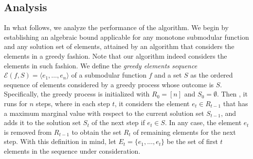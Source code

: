 \documentclass[11pt]{article}
\theoremstyle{plain}
\theoremstyle{definition}
\begin{document}
\subsection{Analysis} \label{subsec:Analysis}
In what follows, we analyze the performance of the algorithm. We
begin by establishing an algebraic bound applicable for any
monotone submodular function and any solution set of elements,
attained by an algorithm that considers the elements in a greedy
fashion. Note that our algorithm indeed considers the elements in
such fashion. We define the \emph{greedy elements sequence}
$\mathcal{E}(f,S) = \langle e_1, \ldots, e_n \rangle$ of a
submodular function $f$ and a set $S$ as the ordered sequence of
elements considered by a greedy process whose outcome is $S$.
Specifically, the greedy process is initialized with $R_0 = [n]$
and $S_0 = \emptyset$. Then , it runs for $n$ steps, where in each
step $t$, it considers the element $e_t \in R_{t-1}$ that has a
maximum marginal value with respect to the current solution set
$S_{t-1}$, and adds it to the solution set $S_t$ of the next step
if $e_t \in S$. In any case, the element $e_t$ is removed from
$R_{t-1}$ to obtain the set $R_t$ of remaining elements for the
next step. With this definition in mind, let $E_t =
\{e_1,\ldots,e_t\}$ be the set of first $t$ elements in the
sequence under consideration.
\end{document}
